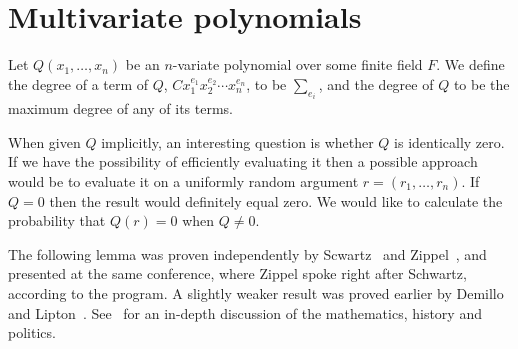 \documentclass{article}
\begin{document}
\section{Multivariate polynomials}
Let $Q({x_1, \ldots, x_n})$ be an $n$-variate polynomial over some
finite field $F$. We define the degree of a term of $Q$,
$Cx_1^{e_1}x_2^{e_2} \cdots x_n^{e_n}$, to be $\sum_{e_i}$, and the
degree of $Q$ to be the maximum degree of any of its terms.

When given $Q$ implicitly, an interesting question is whether $Q$ is
identically zero. If we have the possibility of efficiently evaluating
it then a possible approach would be to evaluate it on a uniformly
random argument $r = (r_1, \ldots, r_n)$. If $Q = 0$ then the result
would definitely equal zero. We would like to calculate the
probability that $Q(r) = 0$ when $Q \neq 0$.

The following lemma was proven independently by
Scwartz~\cite{Schwartz:1980} and Zippel~\cite{Zippel:1979}, and
presented at the same conference, where Zippel spoke right after
Schwartz, according to the program. A slightly weaker result was
proved earlier by Demillo and
Lipton~\cite{DemilloLipton:1978}. See~\cite{LiptonBlog} for an
in-depth discussion of the mathematics, history and politics.
\end{document}
